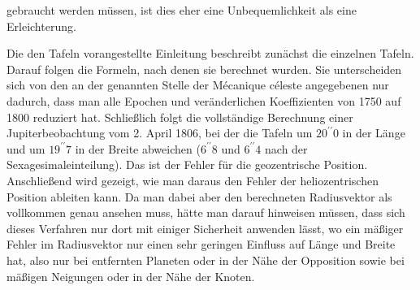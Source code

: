 gebraucht werden müssen, ist dies eher eine Unbequemlichkeit als eine Erleichterung.

Die den Tafeln vorangestellte Einleitung beschreibt zunächst die einzelnen Tafeln. Darauf folgen die Formeln, nach denen sie berechnet wurden. Sie unterscheiden sich von den an der genannten Stelle der Mécanique céleste angegebenen nur dadurch, dass man alle Epochen und veränderlichen Koeffizienten von 1750 auf 1800 reduziert hat. Schließlich folgt die vollständige Berechnung einer Jupiterbeobachtung vom 2. April 1806, bei der die Tafeln um $20^{\prime\prime}0$ in der Länge und um $19^{\prime\prime}7$ in der Breite abweichen ($6^{\prime\prime}8$ und $6^{\prime\prime}4$ nach der Sexagesimaleinteilung). Das ist der Fehler für die geozentrische Position. Anschließend wird gezeigt, wie man daraus den Fehler der heliozentrischen Position ableiten kann. Da man dabei aber den berechneten Radiusvektor als vollkommen genau ansehen muss, hätte man darauf hinweisen müssen, dass sich dieses Verfahren nur dort mit einiger Sicherheit anwenden lässt, wo ein mäßiger Fehler im Radiusvektor nur einen sehr geringen Einfluss auf Länge und Breite hat, also nur bei entfernten Planeten oder in der Nähe der Opposition sowie bei mäßigen Neigungen oder in der Nähe der Knoten.

